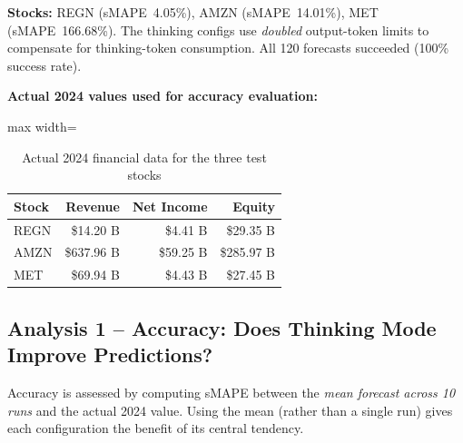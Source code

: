 \documentclass[11pt,a4paper]{article}
\begin{document}
\textbf{Stocks:} REGN (sMAPE~4.05\%), AMZN (sMAPE~14.01\%), MET (sMAPE~166.68\%).
The thinking configs use \emph{doubled} output-token limits to compensate for
thinking-token consumption.  All 120 forecasts succeeded (100\% success rate).

\textbf{Actual 2024 values used for accuracy evaluation:}

\begin{table}[H]\centering
\caption{Actual 2024 financial data for the three test stocks}
\label{tab:actuals}
\begin{adjustbox}{max width=\textwidth}
\begin{tabular}{lrrr}\toprule
\textbf{Stock} & \textbf{Revenue} & \textbf{Net Income} & \textbf{Equity}\\\midrule
REGN & \$14.20 B & \$4.41 B  & \$29.35 B\\
AMZN & \$637.96 B & \$59.25 B & \$285.97 B\\
MET  & \$69.94 B  & \$4.43 B  & \$27.45 B\\
\bottomrule
\end{tabular}
\end{adjustbox}
\end{table}

\subsection{Analysis 1 -- Accuracy: Does Thinking Mode Improve Predictions?}

Accuracy is assessed by computing sMAPE between the \emph{mean forecast
across 10 runs} and the actual 2024 value.  Using the mean (rather than a single
run) gives each configuration the benefit of its central tendency.
\end{document}
